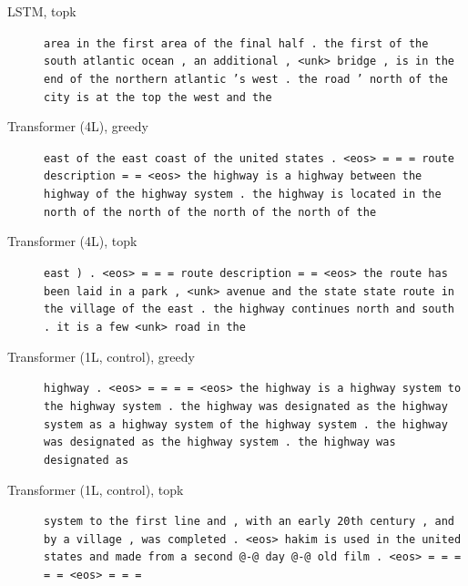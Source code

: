 \begin{description}
\item[LSTM, topk] \texttt{\small area in the first area of the final half . the first of the south atlantic ocean , an additional , \textless{}unk\textgreater{} bridge , is in the end of the northern atlantic 's west . the road ' north of the city is at the top the west and the}
\item[Transformer (4L), greedy] \texttt{\small east of the east coast of the united states . \textless{}eos\textgreater{} = = = route description = = \textless{}eos\textgreater{} the highway is a highway between the highway of the highway system . the highway is located in the north of the north of the north of the north of the}
\item[Transformer (4L), topk] \texttt{\small east ) . \textless{}eos\textgreater{} = = = route description = = \textless{}eos\textgreater{} the route has been laid in a park , \textless{}unk\textgreater{} avenue and the state state route in the village of the east . the highway continues north and south . it is a few \textless{}unk\textgreater{} road in the}
\item[Transformer (1L, control), greedy] \texttt{\small highway . \textless{}eos\textgreater{} = = = = \textless{}eos\textgreater{} the highway is a highway system to the highway system . the highway was designated as the highway system as a highway system of the highway system . the highway was designated as the highway system . the highway was designated as}
\item[Transformer (1L, control), topk] \texttt{\small system to the first line and , with an early 20th century , and by a village , was completed . \textless{}eos\textgreater{} hakim is used in the united states and made from a second @-@ day @-@ old film . \textless{}eos\textgreater{} = = = = = \textless{}eos\textgreater{} = = =}
\end{description}
